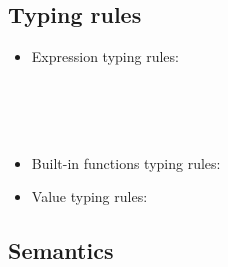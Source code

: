 \subsection{Typing rules}
\begin{itemize}
	
	\item Expression typing rules:\\
	
	
	\\[2ex]
	
	
	\\[2ex]
	
	\\[2ex]
	
	
\item  Built-in functions typing rules:\\

	
	\PT{\Axiom{\Typef{\iotan}{\int} {\tseq{\int}}}}
	\PT{\Axiom{\Typef{\plusn}{\int,\int} {\int}}}
	
	\item Value typing rules: \\
	
	
	
\end{itemize}


\subsection{Semantics}

